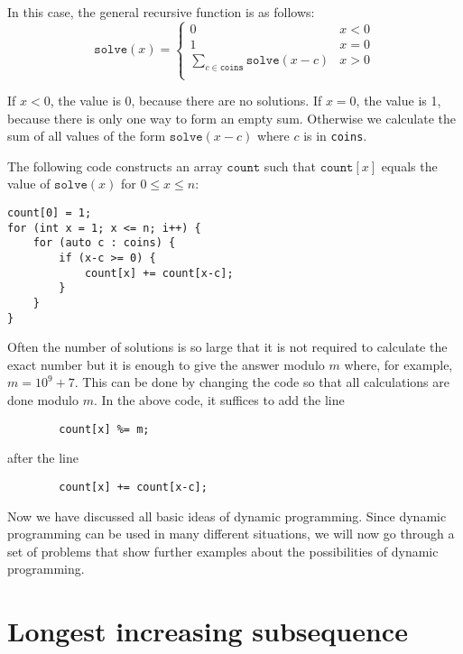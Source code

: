 In this case, the general recursive function is as follows:
\begin{equation*}
    \texttt{solve}(x) = \begin{cases}
               0               & x < 0\\
               1               & x = 0\\
               \sum_{c \in \texttt{coins}} \texttt{solve}(x-c) & x > 0 \\
           \end{cases}
\end{equation*}

If $x<0$, the value is 0, because there are no solutions.
If $x=0$, the value is 1, because there is only one way
to form an empty sum.
Otherwise we calculate the sum of all values
of the form $\texttt{solve}(x-c)$ where $c$ is in \texttt{coins}.

The following code constructs an array
$\texttt{count}$ such that
$\texttt{count}[x]$ equals
the value of $\texttt{solve}(x)$
for $0 \le x \le n$:

\begin{lstlisting}
count[0] = 1;
for (int x = 1; x <= n; i++) {
    for (auto c : coins) {
        if (x-c >= 0) {
            count[x] += count[x-c];
        }
    }
}
\end{lstlisting}

Often the number of solutions is so large
that it is not required to calculate the exact number
but it is enough to give the answer modulo $m$
where, for example, $m=10^9+7$.
This can be done by changing the code so that
all calculations are done modulo $m$.
In the above code, it suffices to add the line
\begin{lstlisting}
        count[x] %= m;
\end{lstlisting}
after the line
\begin{lstlisting}
        count[x] += count[x-c];
\end{lstlisting}

Now we have discussed all basic
ideas of dynamic programming.
Since dynamic programming can be used
in many different situations,
we will now go through a set of problems
that show further examples about the
possibilities of dynamic programming.

\section{Longest increasing subsequence}


